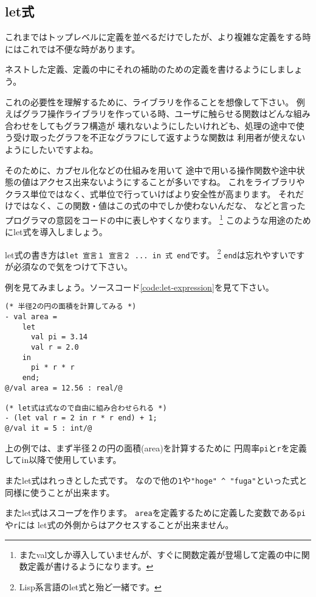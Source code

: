 \documentclass[11pt,a4paper]{article}
\begin{document}
\subsection{let式}
これまではトップレベルに定義を並べるだけでしたが、より複雑な定義をする時にはこれでは不便な時があります。

ネストした定義、定義の中にそれの補助のための定義を書けるようにしましょう。

これの必要性を理解するために、ライブラリを作ることを想像して下さい。
例えばグラフ操作ライブラリを作っている時、ユーザに触らせる関数はどんな組み合わせをしてもグラフ構造が
壊れないようにしたいけれども、処理の途中で使う受け取ったグラフを不正なグラフにして返すような関数は
利用者が使えないようにしたいですよね。

そのために、カプセル化などの仕組みを用いて
途中で用いる操作関数や途中状態の値はアクセス出来ないようにすることが多いですね。
これをライブラリやクラス単位ではなく、式単位で行っていけばより安全性が高まります。
それだけではなく、この関数・値はこの式の中でしか使わないんだな、
などと言ったプログラマの意図をコードの中に表しやすくなります。
\footnote{またval文しか導入していませんが、すぐに関数定義が登場して定義の中に関数定義が書けるようになります。}
このような用途のためにlet式を導入しましょう。

let式の書き方は\lstinline{let 宣言１ 宣言２ ... in 式 end}です。
\footnote{Lisp系言語のlet式と殆ど一緒です。}
\lstinline{end}は忘れやすいですが必須なので気をつけて下さい。

例を見てみましょう。ソースコード\ref{code:let-expression}を見て下さい。

\begin{lstlisting}[caption=let式,label=code:let-expression]
(* 半径2の円の面積を計算してみる *)
- val area =
    let
      val pi = 3.14
      val r = 2.0
    in
      pi * r * r
    end;
@/val area = 12.56 : real/@

(* let式は式なので自由に組み合わせられる *)
- (let val r = 2 in r * r end) + 1;
@/val it = 5 : int/@
\end{lstlisting}

上の例では、まず半径２の円の面積(area)を計算するために
円周率\lstinline{pi}と\lstinline{r}を定義してin以降で使用しています。

またlet式はれっきとした式です。
なので他の\lstinline{1}や\lstinline{"hoge" ^ "fuga"}といった式と同様に使うことが出来ます。

またlet式はスコープを作ります。
\lstinline{area}を定義するために定義した変数である\lstinline{pi}や\lstinline{r}には
let式の外側からはアクセスすることが出来ません。
\end{document}

